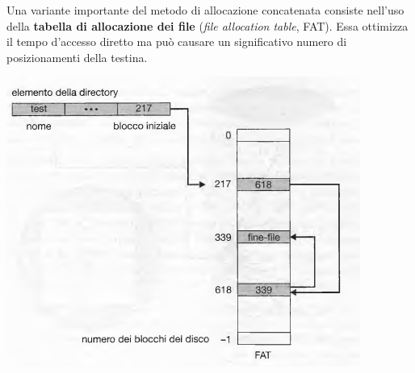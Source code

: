 \documentclass[11pt,a4paper]{article}
\begin{document}
{Una variante importante del metodo di allocazione concatenata consiste nell'uso della \textbf{tabel­la di allocazione dei file} (\emph{file allocation table}, FAT). Essa ottimizza il tempo d'accesso diretto ma può causare un significativo numero di posizionamenti della testina.
\begin{center}
  \includegraphics[scale=0.6]{img/0057.png}
\end{center}

}
\end{document}
